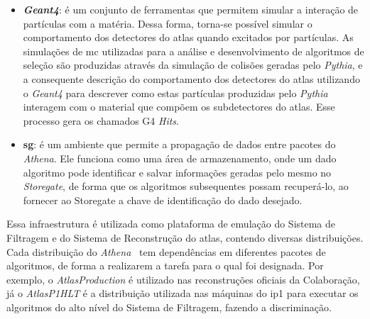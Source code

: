 \begin{itemize}
\begin{figure}[b!]
\begin{minipage}{\textwidth}
{desenhados em azul escuro. Os globos em vermelho escuro representam processos de
colisão rígida dos hádrons em colisão. Fenômenos de \emph{bremsstrahlung} de
QCD{\footnote{Os fenômenos de \emph{bremsstrahlung} de QCD são parecidos 
com os mesmos para QED, explicados no Subtópico~{\ref{par:chuveiro_em}}, contudo, ao invés
de partículas eletricamente carregadas, é correspondente para partículas contendo
cores (a carga correspondente para a força forte) mas liberando glúons ao invés
de fótons. Os glúons, diferente dos fótons, podem sofrer de seu próprio
\emph{bremsstrahlung}}}
estão desenhados em azul para o estado inicial e vermelho para o estado
final. O modelo para Múltiplas Interações de Pártons (MPI), que no caso seria um
Evento Adjacente (UE) está em roxo. A hadronização dos pártons é representada
por elipses verde claro. Os decaimentos dos hádrons estão em verde escuro.
Finalmente, o \emph{bremsstrahlung} de QED é esboçado em amarelo.
Extraído de {\cite{mc_event}}.}
\setcounter{footnote}{\value{mpfootnote}}
\end{minipage}
\label{fig:evento_mc}
\end{figure}

\item \textbf{\emph{Geant4}}: é um conjunto de ferramentas que permitem simular a interação de
partículas com a matéria. Dessa forma, torna-se possível simular o comportamento
dos detectores do \gls{atlas} quando excitados por partículas. As simulações de
\gls{mc} utilizadas para a análise e desenvolvimento de algoritmos de seleção são
produzidas através da simulação de colisões geradas pelo \emph{Pythia}, e a consequente
descrição do comportamento dos detectores do \gls{atlas} utilizando o
\emph{Geant4} para descrever como estas partículas produzidas pelo \emph{Pythia} interagem 
com o material que compõem os subdetectores do \gls{atlas}. Esse processo gera
os chamados G4 \emph{Hits}.
\item \textbf{\gls{sg}}: é um ambiente que permite a propagação de dados entre pacotes do
\emph{Athena}. Ele funciona como uma área de armazenamento, onde um dado algoritmo pode
identificar e salvar informações geradas pelo mesmo no \emph{Storegate}, de forma que
os algoritmos subsequentes possam recuperá-lo, ao fornecer ao Storegate a chave
de identificação do dado desejado.
\end{itemize}

Essa infraestrutura é utilizada como plataforma de emulação do Sistema de
Filtragem e do Sistema de Reconstrução do \gls{atlas}, contendo diversas
distribuições. Cada distribuição do \emph{Athena}~\cite{atlas_computing_tdr} 
tem dependências em diferentes
pacotes de algoritmos, de forma a realizarem a tarefa para o qual foi designada. 
Por exemplo, o \emph{AtlasProduction} é utilizado 
nas reconstruções oficiais da Colaboração, já o \emph{AtlasP1HLT} é a
distribuição utilizada nas máquinas do \gls{ip}1 para executar os algoritmos 
do alto nível do Sistema de Filtragem, fazendo a discriminação. 

